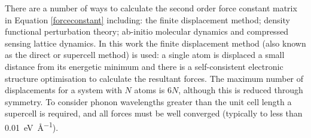 There are a number of ways to calculate the second order force constant matrix in Equation \ref{forceconstant} including: the finite displacement method; density functional perturbation theory; ab-initio molecular dynamics and compressed sensing lattice dynamics.
In this work the finite displacement method (also known as the direct or supercell method) is used: a single atom is displaced a small distance from its energetic minimum and there is a self-consistent electronic structure optimisation to calculate the resultant forces. The maximum number of displacements for a system with $N$ atoms is $6N$, although this is reduced through symmetry. 
To consider phonon wavelengths greater than the unit cell length a supercell is required, and all forces must be well converged (typically to less than \SI{0.01}{\electronvolt\per\angstrom}).







